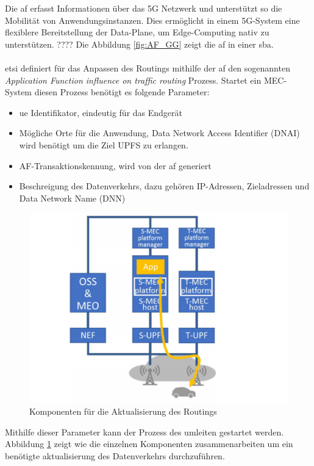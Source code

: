 \documentclass[runningheads]{llncs}
\numberwithin{figure}{section}
\begin{document}
Die \acrfull{af} erfasst Informationen über das 5G Netzwerk und unterstützt so die Mobilität von Anwendungsinstanzen. 
Dies ermöglicht in einem 5G-System eine flexiblere Bereitstellung der Data-Plane, um Edge-Computing nativ zu unterstützen. ????
Die Abbildung \ref{fig:AF_GG} zeigt die \acrshort{af} in einer \acrlong{sba}.
\\
\\
\acrshort{etsi} definiert für das Anpassen des Routings mithilfe der \acrshort{af} den sogenannten \textit{Application Function influence on traffic routing} Prozess.
Startet ein MEC-System diesen Prozess benötigt es folgende Parameter:
\begin{itemize}
  \item \acrshort{ue} Identifikator, eindeutig für das Endgerät
  \item Mögliche Orte für die Anwendung, Data Network Access Identifier (DNAI) wird benötigt um die Ziel UPFS zu erlangen.
  \item AF-Transaktionskennung, wird von der \acrshort{af} generiert
  \item Beschreigung des Datenverkehrs, dazu gehören IP-Adressen, Zieladressen und Data Network Name (DNN)
\end{itemize}
\begin{figure}
  \includegraphics[width=\linewidth]{images/Datenverkehr_Update.png}
  \caption{Komponenten für die Aktualisierung des Routings}
  \label{fig:Datenverkehr_Update}
\end{figure}
Mithilfe dieser Parameter kann der Prozess des umleiten gestartet werden.
Abbildung \ref{fig:Datenverkehr_Update} zeigt wie die einzelnen Komponenten zusammenarbeiten um ein benötigte aktualisierung des Datenverkehrs durchzuführen.
\end{document}
